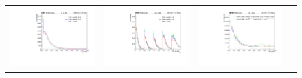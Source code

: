 \begin{figure}[htp]
\begin{tabular}{cccc}
\hspace{-0.5cm}
\includegraphics[scale=0.20]{fig/chapt6/qcd/qcd_mu_ch/ttbar_m_3region_compare_muCh.pdf}
& \hspace{-1.3cm} \includegraphics[scale=0.20]{fig/chapt6/qcd/qcd_mu_ch/ttbar_m_cos_3region_compare_muCh.pdf}
& \hspace{-1.3cm} \includegraphics[scale=0.20]{fig/chapt6/qcd/qcd_e_ch/ttbar_m_3region_compare_eCh.pdf}

\end{tabular}
\end{figure}
